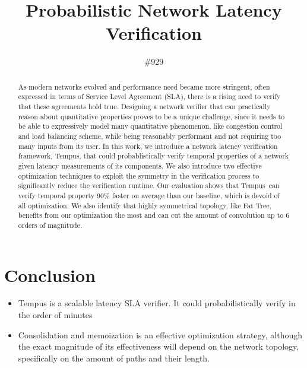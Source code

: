 \documentclass[10pt,sigconf,letterpaper]{acmart}
\title{Probabilistic Network Latency Verification}
\author{\#929}
\newcommand{\tool}[0]{Tempus}
\begin{document}
\begin{abstract}
    As modern networks evolved and performance need became more stringent, often 
    expressed in terms of Service Level Agreement (SLA), there is a rising need to verify that these 
    agreements hold true.
    Designing a network verifier that can practically reason about quantitative properties proves to be 
    a unique challenge, since it needs to be able to expressively model many quantitative phenomenon, like 
    congestion control and load balancing scheme, while being reasonably performant and not 
    requiring too many inputs from its user. 
    In this work, we introduce a network latency verification framework, \tool, that could probablistically 
    verify temporal properties of a network given latency measurements of its components. 
    We also introduce two effective optimization techniques to exploit the symmetry in the verification 
    process to significantly reduce the verification runtime.
    Our evaluation shows that \tool\ can verify temporal property 90\% faster on average than 
    our baseline, which is devoid of all optimization.
    We also identify that highly symmetrical topology, like Fat Tree, benefits from our optimization the most 
    and can cut the amount of convolution up to 6 orders of magnitude.
\end{abstract}

\maketitle



















\section{Conclusion} \label{sec:conc}
\begin{itemize}
    \item Tempus is a scalable latency SLA verifier. It could probabilistically verify in the order of minutes
    \item Consolidation and memoization is an effective optimization strategy, although the exact magnitude of 
        its effectiveness will depend on the network topology, specifically on the amount of paths and their 
        length.
\end{itemize}



\end{document}
